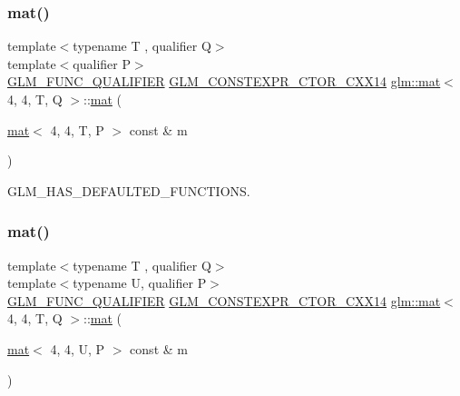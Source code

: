 \mbox{\label{structglm_1_1mat_3_014_00_014_00_01_t_00_01_q_01_4_a201642febedfc558e98f60763db82ee4}} 
\subsubsection{\texorpdfstring{mat()}{mat()}\hspace{0.1cm}{\footnotesize\ttfamily [18/21]}}
{\footnotesize\ttfamily template$<$typename T , qualifier Q$>$ \\
template$<$qualifier P$>$ \\
\mbox{\hyperlink{setup_8hpp_a33fdea6f91c5f834105f7415e2a64407}{G\+L\+M\+\_\+\+F\+U\+N\+C\+\_\+\+Q\+U\+A\+L\+I\+F\+I\+ER}} \mbox{\hyperlink{setup_8hpp_a0900f9145e68bf6061b6f5e7be3fa751}{G\+L\+M\+\_\+\+C\+O\+N\+S\+T\+E\+X\+P\+R\+\_\+\+C\+T\+O\+R\+\_\+\+C\+X\+X14}} \mbox{\hyperlink{structglm_1_1mat}{glm\+::mat}}$<$ 4, 4, T, Q $>$\+::\mbox{\hyperlink{structglm_1_1mat}{mat}} (\begin{DoxyParamCaption}\item[{\mbox{\hyperlink{structglm_1_1mat}{mat}}$<$ 4, 4, T, P $>$ const \&}]{m }\end{DoxyParamCaption})}



G\+L\+M\+\_\+\+H\+A\+S\+\_\+\+D\+E\+F\+A\+U\+L\+T\+E\+D\+\_\+\+F\+U\+N\+C\+T\+I\+O\+NS. 

\mbox{\label{structglm_1_1mat_3_014_00_014_00_01_t_00_01_q_01_4_ad2beaa9b97c574cef34b46ee73c86501}} 
\subsubsection{\texorpdfstring{mat()}{mat()}\hspace{0.1cm}{\footnotesize\ttfamily [19/21]}}
{\footnotesize\ttfamily template$<$typename T , qualifier Q$>$ \\
template$<$typename U, qualifier P$>$ \\
\mbox{\hyperlink{setup_8hpp_a33fdea6f91c5f834105f7415e2a64407}{G\+L\+M\+\_\+\+F\+U\+N\+C\+\_\+\+Q\+U\+A\+L\+I\+F\+I\+ER}} \mbox{\hyperlink{setup_8hpp_a0900f9145e68bf6061b6f5e7be3fa751}{G\+L\+M\+\_\+\+C\+O\+N\+S\+T\+E\+X\+P\+R\+\_\+\+C\+T\+O\+R\+\_\+\+C\+X\+X14}} \mbox{\hyperlink{structglm_1_1mat}{glm\+::mat}}$<$ 4, 4, T, Q $>$\+::\mbox{\hyperlink{structglm_1_1mat}{mat}} (\begin{DoxyParamCaption}\item[{\mbox{\hyperlink{structglm_1_1mat}{mat}}$<$ 4, 4, U, P $>$ const \&}]{m }\end{DoxyParamCaption})}

